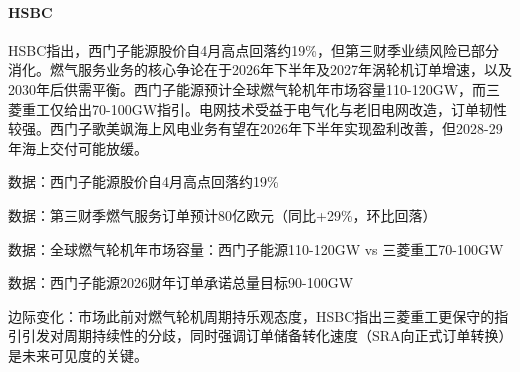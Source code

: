 \documentclass[11pt]{ctexart}
\begin{document}
\paragraph{HSBC} HSBC指出，西门子能源股价自4月高点回落约19\%，但第三财季业绩风险已部分消化。燃气服务业务的核心争论在于2026年下半年及2027年涡轮机订单增速，以及2030年后供需平衡。西门子能源预计全球燃气轮机年市场容量110-120GW，而三菱重工仅给出70-100GW指引。电网技术受益于电气化与老旧电网改造，订单韧性较强。西门子歌美飒海上风电业务有望在2026年下半年实现盈利改善，但2028-29年海上交付可能放缓。
{\small\color{refgray}数据：西门子能源股价自4月高点回落约19\%\par}
{\small\color{refgray}数据：第三财季燃气服务订单预计80亿欧元（同比+29\%，环比回落）\par}
{\small\color{refgray}数据：全球燃气轮机年市场容量：西门子能源110-120GW vs 三菱重工70-100GW\par}
{\small\color{refgray}数据：西门子能源2026财年订单承诺总量目标90-100GW\par}
{\small\color{refgray}边际变化：市场此前对燃气轮机周期持乐观态度，HSBC指出三菱重工更保守的指引引发对周期持续性的分歧，同时强调订单储备转化速度（SRA向正式订单转换）是未来可见度的关键。\par}
\end{document}
